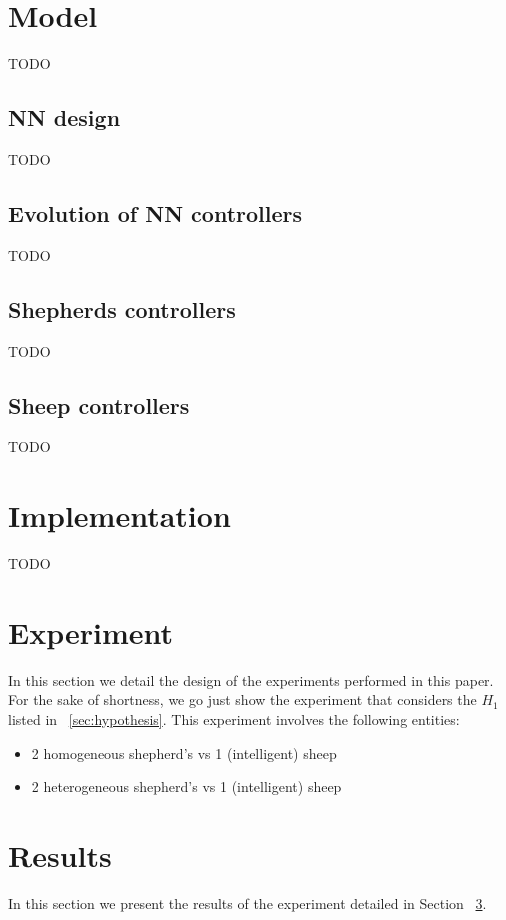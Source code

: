 \documentclass[conference]{IEEEtran}
\begin{document}
\section{Model}
TODO

\subsection{NN design}
TODO

\subsection{Evolution of NN controllers}
TODO

\subsection{Shepherds controllers}
TODO

\subsection{Sheep controllers}
TODO

\section{Implementation}
TODO

\section{Experiment}
\label{sec:experiment}
In this section we detail the design of the experiments performed in this paper.
For the sake of shortness, we go just show the experiment that considers the $H_1$ listed in ~\ref{sec:hypothesis}.
This experiment involves the following entities:
\begin{itemize}
	\item 2 homogeneous shepherd’s vs 1 (intelligent) sheep
	\item 2 heterogeneous shepherd’s vs 1 (intelligent) sheep
\end{itemize}


\section{Results}
In this section we present the results of the experiment detailed in Section ~\ref{sec:experiment}.
\end{document}
